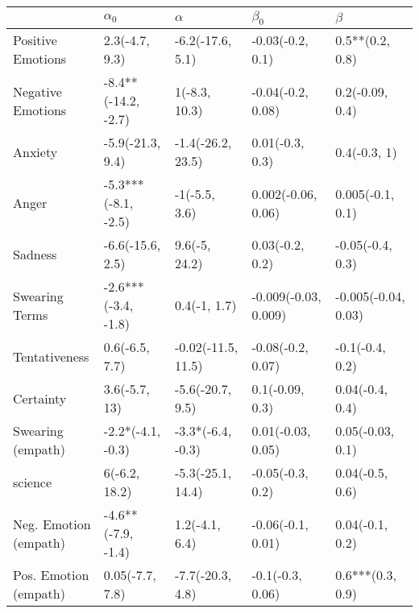\begin{tabular}{lllll}
\toprule
{} &           $\alpha_0$ &            $\alpha$ &             $\beta_0$ &              $\beta$ \\
\midrule
Positive Emotions     &       2.3(-4.7, 9.3) &    -6.2(-17.6, 5.1) &      -0.03(-0.2, 0.1) &      0.5**(0.2, 0.8) \\
Negative Emotions     &  -8.4**(-14.2, -2.7) &       1(-8.3, 10.3) &     -0.04(-0.2, 0.08) &      0.2(-0.09, 0.4) \\
Anxiety               &     -5.9(-21.3, 9.4) &   -1.4(-26.2, 23.5) &       0.01(-0.3, 0.3) &         0.4(-0.3, 1) \\
Anger                 &  -5.3***(-8.1, -2.5) &       -1(-5.5, 3.6) &    0.002(-0.06, 0.06) &     0.005(-0.1, 0.1) \\
Sadness               &     -6.6(-15.6, 2.5) &       9.6(-5, 24.2) &       0.03(-0.2, 0.2) &     -0.05(-0.4, 0.3) \\
Swearing Terms        &  -2.6***(-3.4, -1.8) &        0.4(-1, 1.7) &  -0.009(-0.03, 0.009) &  -0.005(-0.04, 0.03) \\
Tentativeness         &       0.6(-6.5, 7.7) &  -0.02(-11.5, 11.5) &     -0.08(-0.2, 0.07) &      -0.1(-0.4, 0.2) \\
Certainty             &        3.6(-5.7, 13) &    -5.6(-20.7, 9.5) &       0.1(-0.09, 0.3) &      0.04(-0.4, 0.4) \\
Swearing (empath)     &    -2.2*(-4.1, -0.3) &   -3.3*(-6.4, -0.3) &     0.01(-0.03, 0.05) &     0.05(-0.03, 0.1) \\
science               &        6(-6.2, 18.2) &   -5.3(-25.1, 14.4) &      -0.05(-0.3, 0.2) &      0.04(-0.5, 0.6) \\
Neg. Emotion (empath) &   -4.6**(-7.9, -1.4) &      1.2(-4.1, 6.4) &     -0.06(-0.1, 0.01) &      0.04(-0.1, 0.2) \\
Pos. Emotion (empath) &      0.05(-7.7, 7.8) &    -7.7(-20.3, 4.8) &      -0.1(-0.3, 0.06) &     0.6***(0.3, 0.9) \\
\bottomrule
\end{tabular}
